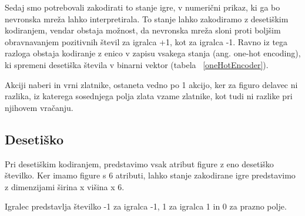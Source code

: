 \documentclass[a4paper, 12pt]{book}
\begin{document}
Sedaj smo potrebovali zakodirati to stanje igre, v numerični prikaz, ki ga bo nevronska mreža lahko interpretirala. 
To stanje lahko zakodiramo z desetiškim kodiranjem, vendar obstaja možnost, da nevronska mreža sloni proti boljšim obravnavanjem pozitivnih števil za igralca +1, kot za igralca -1. 
Ravno iz tega razloga obstaja kodiranje z enico v zapisu vsakega stanja (ang. one-hot encoding), ki spremeni desetiška števila v binarni vektor (tabela ~\ref{oneHotEncoder}).

Akciji naberi in vrni zlatnike, ostaneta vedno po 1 akcijo, ker za figuro delavec ni razlika, iz katerega sosednjega polja zlata vzame zlatnike, kot tudi ni razlike pri njihovem vračanju.

\subsection{Desetiško}
Pri desetiškim kodiranjem, predstavimo vsak atribut figure z eno desetiško številko.
Ker imamo figure s 6 atributi, lahko stanje zakodirane igre predstavimo z dimenzijami širina x višina x 6.

Igralec predstavlja številko -1 za igralca -1, 1 za igralca 1 in 0 za prazno polje.
\end{document}
